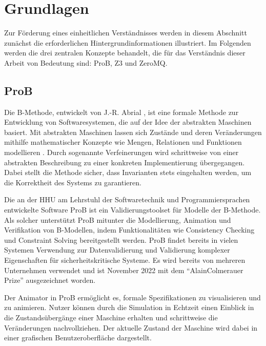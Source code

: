 
\section{Grundlagen}

Zur Förderung eines einheitlichen Verständnisses werden in diesem Abschnitt zunächst die erforderlichen Hintergrundinformationen illustriert.
Im Folgenden werden die drei zentralen Konzepte behandelt, die für das Verständnis dieser Arbeit von Bedeutung sind: ProB, Z3 und ZeroMQ.

\subsection{ProB}
Die B-Methode, entwickelt von J.-R. Abrial \cite{abrial1996b}, ist eine formale Methode zur Entwicklung von Softwaresystemen,
die auf der Idee der abstrakten Maschinen basiert.
Mit abstrakten Maschinen lassen sich Zustände und deren Veränderungen mithilfe mathematischer Konzepte wie Mengen,
Relationen und Funktionen modellieren \cite{leuschel2003prob}.
Durch sogenannte Verfeinerungen wird schrittweise von einer abstrakten Beschreibung zu einer konkreten Implementierung übergegangen.
Dabei stellt die Methode sicher, dass Invarianten stets eingehalten werden,
um die Korrektheit des Systems zu garantieren.

Die an der HHU am Lehrstuhl der Softwaretechnik und Programmiersprachen entwickelte Software ProB \cite{leuschel2003prob} ist ein Validierungstoolset für Modelle der B-Methode.
Als solcher unterstützt ProB mitunter die Modellierung, Animation und Verifikation von B-Modellen,
indem Funktionalitäten wie Consistency Checking und Constraint Solving bereitgestellt werden.
ProB findet bereits in vielen Systemen Verwendung zur Datenvalidierung und Validierung komplexer Eigenschaften für sicherheitskritische Systeme.
Es wird bereits von mehreren Unternehmen verwendet und ist November 2022 mit dem \enquote{AlainColmerauer Prize} ausgezeichnet worden.

Der Animator in ProB ermöglicht es, formale Spezifikationen zu visualisieren und zu animieren.
Nutzer können durch die Simulation in Echtzeit einen Einblick in die Zustandsübergänge einer Maschine erhalten und schrittweise die Veränderungen nachvollziehen.
Der aktuelle Zustand der Maschine wird dabei in einer grafischen Benutzeroberfläche dargestellt.


